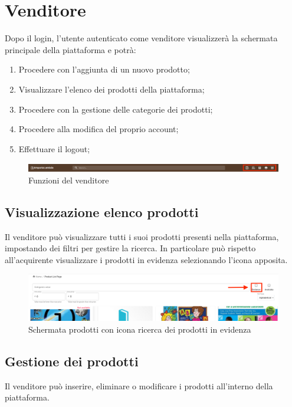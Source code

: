 \section{Venditore}\label{Venditore}
Dopo il login, l'utente autenticato come venditore visualizzerà la schermata principale della piattaforma e potrà:
\begin{enumerate}
	\item Procedere con l'aggiunta di un nuovo prodotto;
	\item Visualizzare l'elenco dei prodotti della piattaforma;
	\item Procedere con la gestione delle categorie dei prodotti;
	\item Procedere alla modifica del proprio account;
	\item Effettuare il logout;
\end{enumerate}
\begin{figure}[H]
	\centering
	\includegraphics[scale=0.4]{Immagini/Venditore/Header.png}
	\caption{Funzioni del venditore}
	\label{fig:FunzioniVenditore}
\end{figure}
\subsection{Visualizzazione elenco prodotti}
Il venditore può visualizzare tutti i suoi prodotti presenti nella piattaforma, impostando dei filtri per gestire la ricerca. In particolare può rispetto all'acquirente visualizzare i prodotti in evidenza selezionando l'icona apposita. 
\begin{figure}[H]
	\centering
	\includegraphics[scale=0.25]{Immagini/Venditore/plp.seller.png}
	\caption{Schermata prodotti con icona ricerca dei prodotti in evidenza}
	\label{fig:ProdottiEvidenza}
\end{figure}
\subsection{Gestione dei prodotti}
Il venditore può inserire, eliminare o modificare i prodotti all'interno della piattaforma.
